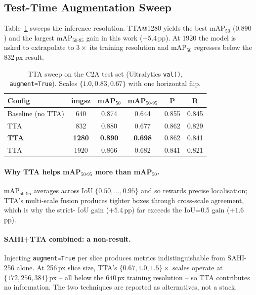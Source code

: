 \documentclass[11pt,a4paper]{article}
\begin{document}
\subsection{Test-Time Augmentation Sweep}
Table~\ref{tab:tta} sweeps the inference resolution. TTA@1280 yields
the best mAP$_{50}$ ($0.890$) and the largest mAP$_{50\text{-}95}$
gain in this work ($+5.4$\,pp). At $1920$ the model is asked to
extrapolate to $3\times$ its training resolution and mAP$_{50}$
regresses below the 832\,px result.

\begin{table}[H]
\centering
\caption{TTA sweep on the C2A test set (Ultralytics \texttt{val()},
\texttt{augment=True}). Scales $\{1.0,0.83,0.67\}$ with one horizontal
flip.}\label{tab:tta}
\small
\begin{tabular}{lccccc}
\toprule
\textbf{Config} & \textbf{imgsz} & \textbf{mAP$_{50}$} & \textbf{mAP$_{50\text{-}95}$} & \textbf{P} & \textbf{R}\\
\midrule
Baseline (no TTA)   & 640  & 0.874 & 0.644 & 0.855 & 0.845\\
TTA                 & 832  & 0.880 & 0.677 & 0.862 & 0.829\\
\textbf{TTA}        & \textbf{1280} & \textbf{0.890} & \textbf{0.698} & 0.862 & 0.841\\
TTA                 & 1920 & 0.866 & 0.682 & 0.841 & 0.821\\
\bottomrule
\end{tabular}
\end{table}

\paragraph{Why TTA helps mAP$_{50\text{-}95}$ more than mAP$_{50}$.}
mAP$_{50\text{-}95}$ averages across IoU $\{0.50,\ldots,0.95\}$ and so
rewards precise localisation; TTA's multi-scale fusion produces
tighter boxes through cross-scale agreement, which is why the strict-
IoU gain ($+5.4$\,pp) far exceeds the IoU=0.5 gain ($+1.6$\,pp).

\paragraph{SAHI+TTA combined: a non-result.}
Injecting \texttt{augment=True} per slice produces metrics
indistinguishable from SAHI-256 alone. At 256\,px slice size, TTA's
$\{0.67,1.0,1.5\}\!\times$ scales operate at $\{172,256,384\}$\,px --
all below the $640$\,px training resolution -- so TTA contributes no
information. The two techniques are reported as alternatives, not a
stack.
\end{document}
